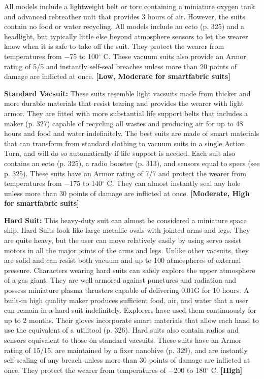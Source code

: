 All models include a lightweight belt or torc containing a miniature oxygen tank and advanced rebreather unit that provides 3 hours of air. However, the suits contain no food or water recycling. All models include an ecto (p. 325) and a headlight, but typically little else beyond atmosphere sensors to let the wearer know when it is safe to take off the suit. They protect the wearer from temperatures from $-$75 to 100$^{\circ}$ C. These vacuum suits also provide an Armor rating of 5/5 and instantly self-seal breaches unless more than 20 points of damage are inflicted at once. \textbf{[Low, Moderate for smartfabric suits]} 

\textbf{Standard Vacsuit:} These suits resemble light vacsuits made from thicker and more durable materials that resist tearing and provides the wearer with light armor. They are fitted with more substantial life support belts that includes a maker (p. 327) capable of recycling all wastes and producing air for up to 48 hours and food and water indefinitely. The best suits are made of smart materials that can transform from standard clothing to vacuum suits in a single Action Turn, and will do so automatically if life support is needed. Each suit also contains an ecto (p. 325), a radio booster (p. 313), and sensors equal to specs (see p. 325). These suits have an Armor rating of 7/7 and protect the wearer from temperatures from $-$175 to 140$^{\circ}$ C. They can almost instantly seal any hole unless more than 30 points of damage are inflicted at once. \textbf{[Moderate, High for smartfabric suits]} 

\textbf{Hard Suit:} This heavy-duty suit can almost be considered a miniature space ship. Hard Suits look like large metallic ovals with jointed arms and legs. They are quite heavy, but the user can move relatively easily by using servo assist motors in all the major joints of the arms and legs. Unlike other vacsuits, they are solid and can resist both vacuum and up to 100 atmospheres of external pressure. Characters wearing hard suits can safely explore the upper atmosphere of a gas giant. They are well armored against punctures and radiation and possess miniature plasma thrusters capable of delivering 0.01G for 10 hours. A built-in high quality maker produces sufficient food, air, and water that a user can remain in a hard suit indefinitely. Explorers have used them continuously for up to 2 months. Their gloves incorporate smart materials that allow each hand to use the equivalent of a utilitool (p. 326). Hard suits also contain radios and sensors equivalent to those on standard vacsuits. These suits have an Armor rating of 15/15, are maintained by a fixer nanohive (p. 329), and are instantly self-sealing of any breach unless more than 30 points of damage are inflicted at once. They protect the wearer from temperatures of $-$200 to 180$^{\circ}$ C. \textbf{[High]} 



